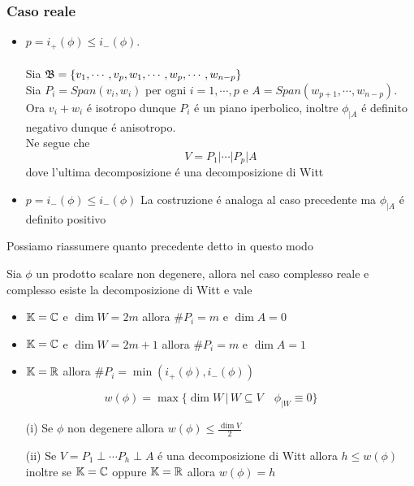 \subsubsection{Caso reale}
\begin{itemize}
\item $p= i_+(\phi) \leq i_-(\phi) $.\\ \\
Sia $\mathfrak{B} = \{ v_1, \cdots , v_p, w_1, \cdots , w_p, \cdots, w_{n-p} \} $\\
Sia $P_i =Span(v_i, w_i) $ per ogni $i=1,\cdots , p $ e $A= Span(w_{p+1}, \cdots , w_{n-p} )$.\\
Ora $v_i +w_i $ \'e isotropo dunque $P_i$ \'e un piano iperbolico, inoltre $\phi_{\vert A } $ \'e definito negativo dunque \'e anisotropo.\\
Ne segue che 
$$ V = P_1\vert \cdots \vert P_p \vert A $$ 
dove l'ultima decomposizione \'e una decomposizione di Witt
\item $p=i_-(\phi) \leq i_-(\phi)$
La costruzione \'e analoga al caso precedente ma $\phi_{\vert A } $ \'e definito positivo
\end{itemize}
\spazio

Possiamo riassumere quanto precedente detto in questo modo
\begin{thm}Sia $\phi$ un prodotto scalare non degenere, allora nel caso complesso reale e complesso esiste la decomposizione di Witt e vale 
\begin{itemize}
\item $\mathbb{K}=\mathbb{C}$  e $\dim W =2m $ allora $\#P_i=m$ e $\dim A =0$
\item $\mathbb{K}=\mathbb{C}$ e $\dim W= 2m+1$ allora $\#P_i=m$ e $\dim A=1$
\item $\mathbb{K}=\mathbb{R}$ allora $\#P_i=\min(i_+(\phi), i_-(\phi))$
\end{itemize}
\end{thm}
\spazio
\begin{defn} \bianco
$$ w(\phi)= \max \{ \dim W \, \vert \, W\subseteq V \quad \phi_{\vert W } \equiv 0 \} $$
\end{defn}
\spazio
\begin{prop}\bianco
\begin{itemize}
\item[(i)] Se $\phi $ non degenere allora $ w(\phi)  \leq \frac{\dim V}{2}$
\item[(ii)] Se $V= P_1 \perp \cdots P_h \perp A $ \'e una decomposizione di Witt allora $h \leq w(\phi)$\\ inoltre se $\mathbb{K}=\mathbb{C} $ oppure $\mathbb{K}=\mathbb{R}$  allora $w(\phi)=h$
\end{itemize}
\end{prop}

